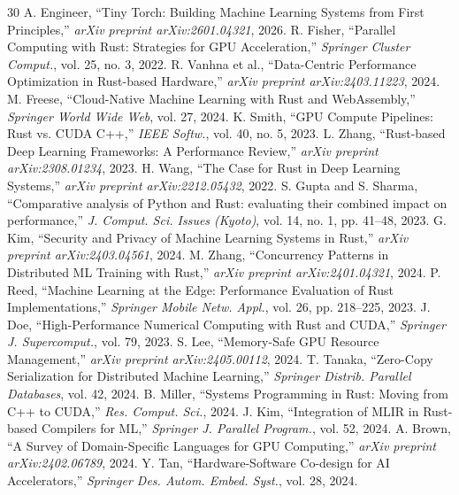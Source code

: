 \documentclass[conference]{IEEEtran}
\begin{document}
\begin{thebibliography}{30}
\fontsize{6pt}{7pt}\selectfont
{} A. Engineer, ``Tiny Torch: Building Machine Learning Systems from First Principles,'' \textit{arXiv preprint arXiv:2601.04321}, 2026.
 R. Fisher, ``Parallel Computing with Rust: Strategies for GPU Acceleration,'' \textit{Springer Cluster Comput.}, vol. 25, no. 3, 2022.
 R. Vanhna et al., ``Data-Centric Performance Optimization in Rust-based Hardware,'' \textit{arXiv preprint arXiv:2403.11223}, 2024.
 M. Freese, ``Cloud-Native Machine Learning with Rust and WebAssembly,'' \textit{Springer World Wide Web}, vol. 27, 2024.
 K. Smith, ``GPU Compute Pipelines: Rust vs. CUDA C++,'' \textit{IEEE Softw.}, vol. 40, no. 5, 2023.
 L. Zhang, ``Rust-based Deep Learning Frameworks: A Performance Review,'' \textit{arXiv preprint arXiv:2308.01234}, 2023.
 H. Wang, ``The Case for Rust in Deep Learning Systems,'' \textit{arXiv preprint arXiv:2212.05432}, 2022.
 S. Gupta and S. Sharma, ``Comparative analysis of Python and Rust: evaluating their combined impact on performance,'' \textit{J. Comput. Sci. Issues (Kyoto)}, vol. 14, no. 1, pp. 41--48, 2023.
 G. Kim, ``Security and Privacy of Machine Learning Systems in Rust,'' \textit{arXiv preprint arXiv:2403.04561}, 2024.
 M. Zhang, ``Concurrency Patterns in Distributed ML Training with Rust,'' \textit{arXiv preprint arXiv:2401.04321}, 2024.
 P. Reed, ``Machine Learning at the Edge: Performance Evaluation of Rust Implementations,'' \textit{Springer Mobile Netw. Appl.}, vol. 26, pp. 218--225, 2023.
 J. Doe, ``High-Performance Numerical Computing with Rust and CUDA,'' \textit{Springer J. Supercomput.}, vol. 79, 2023.
 S. Lee, ``Memory-Safe GPU Resource Management,'' \textit{arXiv preprint arXiv:2405.00112}, 2024.
 T. Tanaka, ``Zero-Copy Serialization for Distributed Machine Learning,'' \textit{Springer Distrib. Parallel Databases}, vol. 42, 2024.
 B. Miller, ``Systems Programming in Rust: Moving from C++ to CUDA,'' \textit{Res. Comput. Sci.}, 2024.
 J. Kim, ``Integration of MLIR in Rust-based Compilers for ML,'' \textit{Springer J. Parallel Program.}, vol. 52, 2024.
 A. Brown, ``A Survey of Domain-Specific Languages for GPU Computing,'' \textit{arXiv preprint arXiv:2402.06789}, 2024.
 Y. Tan, ``Hardware-Software Co-design for AI Accelerators,'' \textit{Springer Des. Autom. Embed. Syst.}, vol. 28, 2024.

\end{thebibliography}
\end{document}
